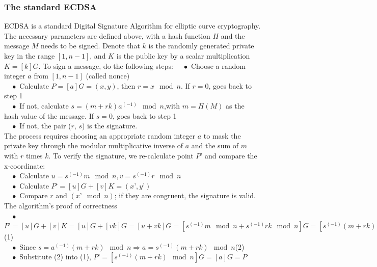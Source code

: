 \subsubsection{The standard ECDSA}
ECDSA is a standard Digital Signature Algorithm for elliptic curve cryptography. The necessary parameters are defined above, with a hash function $H$ and the message $M$ needs to be signed. Denote that $k$ is the randomly generated private key in the range  $[1, n - 1]$, and $K$ is the public key by a scalar multiplication $K =[k]G$. To sign a message, do the following steps:
$\quad\bullet$ Choose a random integer $a$ from $[1, n - 1]$ (called nonce)\\
$\quad\bullet$ Calculate $P = [a]G = (x, y)$, then $r = x \mod n$. If $r = 0$, goes back to step 1\\
$\quad\bullet$ If not, calculate $s=(m+rk) a^(-1) \mod n$,with $m = H(M)$ as the hash value of the message. If $s = 0$, goes back to step 1\\
$\quad\bullet$ If not, the pair ($r$, $s$) is the signature.\\
The process requires choosing an appropriate random integer $a$ to mask the private key through the modular multiplicative inverse of $a$ and the sum of $m$ with $r$ times $k$. To verify the signature, we re-calculate point $P’$ and compare the x-coordinate:\\
$\quad\bullet$ Calculate $u = s^(-1)m \mod n, v = s^(-1)r \mod n$\\
$\quad\bullet$ Calculate $P’ = [u]G + [v]K = (x’, y’)$\\
$\quad\bullet$ Compare $r$ and $(x’ \mod n)$; if they are congruent, the signature is valid.\\
The algorithm’s proof of correctness \\
$\quad\bullet$ $P’ = [u]G + [v]K = [u]G + [vk]G = [u +vk]G = [s^(-1)m \mod n + s^(-1)rk \mod n]G = [s^(-1)(m + rk) \mod n]G$ (1)\\
$\quad\bullet$ Since $s = a^(-1)(m+rk) \mod n \Rightarrow a = s^(-1)(m+rk) \mod n$(2)\\
$\quad\bullet$ Substitute (2) into (1), $P’ = [s^(-1)(m + rk) \mod n]G = [a]G = P$\\

